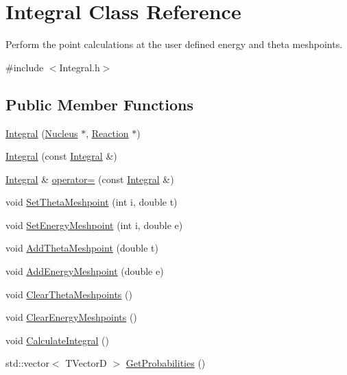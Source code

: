 \hypertarget{classIntegral}{\section{Integral Class Reference}
\label{classIntegral}
}


Perform the point calculations at the user defined energy and theta meshpoints.  




{\ttfamily \#include $<$Integral.\-h$>$}

\subsection*{Public Member Functions}
\begin{DoxyCompactItemize}
\item 
\hyperlink{classIntegral_a6fe4f7ff63a6cf0d9f66be50d2facf5a}{Integral} (\hyperlink{classNucleus}{Nucleus} $\ast$, \hyperlink{classReaction}{Reaction} $\ast$)
\item 
\hyperlink{classIntegral_aaa1d5d5a90ff03465e713dc0f680a369}{Integral} (const \hyperlink{classIntegral}{Integral} \&)
\item 
\hyperlink{classIntegral}{Integral} \& \hyperlink{classIntegral_a19146b107c8d1b38b6b7abc70260e0e9}{operator=} (const \hyperlink{classIntegral}{Integral} \&)
\item 
void \hyperlink{classIntegral_a3c865040dae6d43d9111da3f602a60ed}{Set\-Theta\-Meshpoint} (int i, double t)
\item 
void \hyperlink{classIntegral_a82da64fa035b5c54b3748d32d1396815}{Set\-Energy\-Meshpoint} (int i, double e)
\item 
void \hyperlink{classIntegral_a50278013605b36442df444d812edf309}{Add\-Theta\-Meshpoint} (double t)
\item 
void \hyperlink{classIntegral_a8b87a614966c357e0b6c094a561ec49f}{Add\-Energy\-Meshpoint} (double e)
\item 
void \hyperlink{classIntegral_a00d220bb62afcd2d8a07011f33cfaee0}{Clear\-Theta\-Meshpoints} ()
\item 
void \hyperlink{classIntegral_a16107fb7e111c7d2829309b9881388a1}{Clear\-Energy\-Meshpoints} ()
\item 
void \hyperlink{classIntegral_a9afe2a7e70e391621fdd1c1a8ccec9c7}{Calculate\-Integral} ()
\item 
std\-::vector$<$ T\-Vector\-D $>$ \hyperlink{classIntegral_aa2e6fcbf8d95bc23ba123d684917e571}{Get\-Probabilities} ()
\item 

\end{DoxyCompactItemize}
